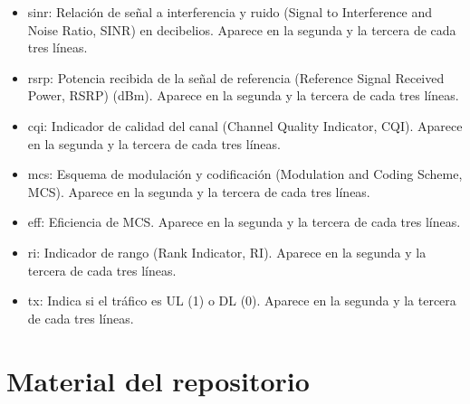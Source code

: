 \documentclass[12pt]{report} %
\begin{document}
\begin{itemize}
{\begin{itemize}
\item sinr: Relación de señal a interferencia y ruido (Signal to Interference and Noise Ratio, SINR) en decibelios. Aparece en la segunda y la tercera de cada tres líneas.
\item rsrp: Potencia recibida de la señal de referencia (Reference Signal Received Power, RSRP) (dBm). Aparece en la segunda y la tercera de cada tres líneas.
\item cqi: Indicador de calidad del canal (Channel Quality Indicator, CQI). Aparece en la segunda y la tercera de cada tres líneas.
\item mcs: Esquema de modulación y codificación (Modulation and Coding Scheme, MCS). Aparece en la segunda y la tercera de cada tres líneas.
\item eff: Eficiencia de MCS. Aparece en la segunda y la tercera de cada tres líneas.
\item ri: Indicador de rango (Rank Indicator, RI). Aparece en la segunda y la tercera de cada tres líneas.
\item tx: Indica si el tráfico es UL (1) o DL (0). Aparece en la segunda y la tercera de cada tres líneas.
\end{itemize}
}
\end{itemize}

\section* {Material del repositorio}
\end{document}

